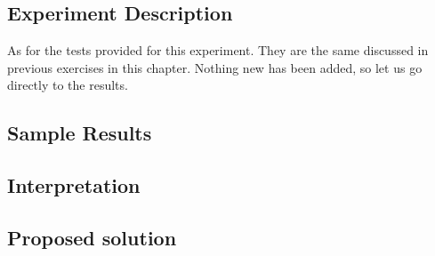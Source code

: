 \subsection{Experiment Description}
\par
As for the tests provided for this experiment. They are the same discussed in
previous exercises in this chapter. Nothing new has been added, so let us go
directly to the results.
\par
\subsection{Sample Results}
\par
\par
\subsection{Interpretation}
\par
\par
\subsection{Proposed solution}
\par
\par
